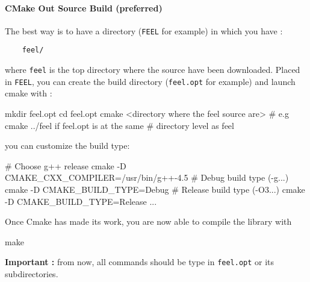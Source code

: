 \paragraph{CMake Out Source Build (preferred)}
The best way is to have a directory (\lstinline|FEEL| for example) in which you have : \\
\begin{lstlisting}
	feel/
\end{lstlisting}
where \lstinline|feel| is the top directory where the source have been downloaded. Placed in \lstinline|FEEL|, you can create the build directory (\lstinline|feel.opt| for example) and launch cmake with :
\begin{unixcom}
  mkdir feel.opt
  cd feel.opt
  cmake <directory where the feel source are>
  # e.g cmake ../feel if feel.opt is at the same
  # directory level as feel
\end{unixcom}
you can customize the build type:
\begin{unixcom}
  # Choose g++ release
  cmake -D CMAKE_CXX_COMPILER=/usr/bin/g++-4.5
  # Debug build type (-g...)
  cmake -D CMAKE_BUILD_TYPE=Debug
  # Release build type (-O3...)
  cmake -D CMAKE_BUILD_TYPE=Release
  ...
\end{unixcom}
Once Cmake has made its work, you are now able to compile the library with
\begin{unixcom}
		make
\end{unixcom}
\textbf{Important :} from now, all commands should be type in \lstinline|feel.opt| or its subdirectories.








